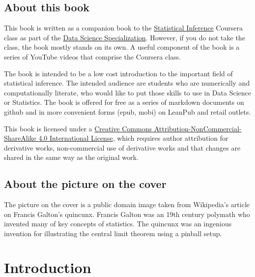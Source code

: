 \documentclass[]{article}
\title{}
\author{}
\date{}
\begin{document}
\maketitle


{
\hypersetup{linkcolor=black}
\setcounter{tocdepth}{2}
\tableofcontents
}
\newpage

\subsection{About this book}\label{about-this-book}

This book is written as a companion book to the
\href{https://www.coursera.org/course/statinference}{Statistical
Inference} Coursera class as part of the
\href{https://www.coursera.org/specialization/jhudatascience/1?utm_medium=courseDescripTop}{Data
Science Specialization}. However, if you do not take the class, the book
mostly stands on its own. A useful component of the book is a series of
YouTube videos that comprise the Coursera class.

The book is intended to be a low cost introduction to the important
field of statistical inference. The intended audience are students who
are numerically and computationally literate, who would like to put
those skills to use in Data Science or Statistics. The book is offered
for free as a series of markdown documents on github and in more
convenient forms (epub, mobi) on LeanPub and retail outlets.

This book is licensed under a
\href{http://creativecommons.org/licenses/by-nc-sa/4.0/}{Creative
Commons Attribution-NonCommercial-ShareAlike 4.0 International License},
which requires author attribution for derivative works, non-commercial
use of derivative works and that changes are shared in the same way as
the original work.

\subsection{About the picture on the
cover}\label{about-the-picture-on-the-cover}

The picture on the cover is a public domain image taken from Wikipedia's
article on Francis Galton's quincunx. Francis Galton was an 19th century
polymath who invented many of key concepts of statistics. The quincunx
was an ingenious invention for illustrating the central limit theorem
using a pinball setup.

\newpage

\section{Introduction}\label{introduction}
\end{document}
